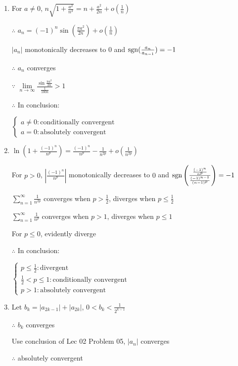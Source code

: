 \begin{enumerate}[1]
\begin{enumerate}[(1)]
     \item
     For $a\not= 0$, $n\sqrt{1+\frac{a^2}{n^2}}=n+\frac{a^2}{2n}+o(\frac{1}{n})$
     \par $\therefore$ $a_n=(-1)^n\sin \left(\frac{\pi a^2}{2n}\right)+o\left(\frac{1}{n}\right)$
     \par $\left|a_n\right|$ monotonically decreases to $0$ and $\mathop{\mathrm{sgn}} (\frac{a_n}{a_{n-1}})=-1$
     \par $\therefore$ $a_n$ converges
     \par $\because$ $\lim\limits_{n\rightarrow{\infty}}\frac{\sin \frac{\pi a^2}{2n}}{\frac{1}{100n}}>1$
     \par $\therefore$ In conclusion:
     \par $\begin{cases} 
      a \not= 0:\text{conditionally convergent}
      \\a = 0:\text{absolutely convergent}
      \end{cases}$

     \item
     $\ln \left(1+\frac{(-1)^n}{n^p}\right)=\frac{(-1)^n}{n^p}-\frac{1}{n^{2p}}+o\left(\frac{1}{n^{2p}}\right)$
     \par For $p>0$, $\left|\frac{(-1)^n}{n^p}\right|$ monotonically decreases to $0$ and $\mathop{\mathrm{sgn}} \left( \frac{\frac{(-1)^n}{n^p}}{\frac{(-1)^{n-1}}{(n-1)^p}}\right) =-1$
     \par $\sum\limits_{n=1}^{\infty}\frac{1}{n^{2p}}$ converges when $p>\frac{1}{2}$, diverges when $p\leqslant\frac{1}{2}$
     \par $\sum\limits_{n=1}^{\infty}\frac{1}{n^{p}}$ converges when $p>1$, diverges when $p\leqslant 1$
     \par For $p\leqslant 0$, evidently diverge
     \par $\therefore$ In conclusion:
     \par $\begin{cases}p \leqslant \frac{1}{2}:\text{divergent}
     \\\frac{1}{2}<p\leqslant 1:\text{conditionally convergent}
     \\p>1:\text{absolutely convergent}
     \end{cases}$

     \item
     Let $b_k=|a_{2k-1}|+|a_{2k}|$, $0<b_k<\frac{1}{2^{k-1}}$
     \par $\therefore$ $b_k$ converges
     \par Use conclusion of Lec 02 Problem 05, $|a_n|$ converges
     \par $\therefore$ absolutely convergent


\end{enumerate}
\end{enumerate}
